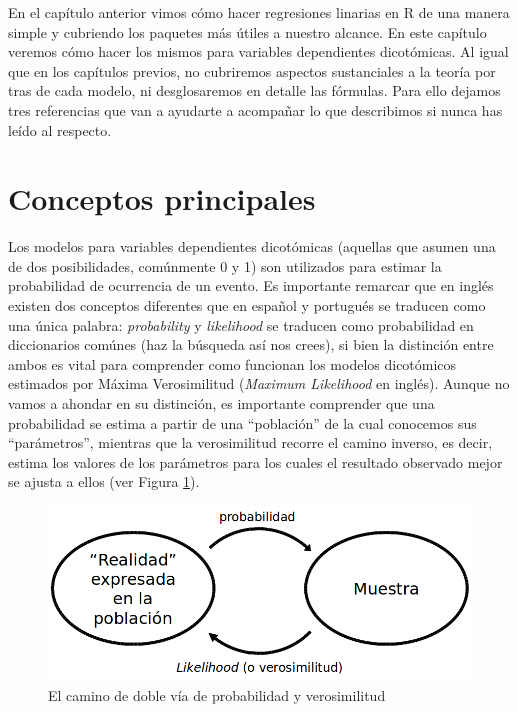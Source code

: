 \documentclass[]{book}
\begin{document}
En el capítulo anterior vimos cómo hacer regresiones linarias en R de
una manera simple y cubriendo los paquetes más útiles a nuestro alcance.
En este capítulo veremos cómo hacer los mismos para variables
dependientes dicotómicas. Al igual que en los capítulos previos, no
cubriremos aspectos sustanciales a la teoría por tras de cada modelo, ni
desglosaremos en detalle las fórmulas. Para ello dejamos tres
referencias que van a ayudarte a acompañar lo que describimos si nunca
has leído al respecto.

\section{Conceptos principales}\label{conceptos-principales}

Los modelos para variables dependientes dicotómicas (aquellas que asumen
una de dos posibilidades, comúnmente 0 y 1) son utilizados para estimar
la probabilidad de ocurrencia de un evento. Es importante remarcar que
en inglés existen dos conceptos diferentes que en español y portugués se
traducen como una única palabra: \emph{probability} y \emph{likelihood}
se traducen como probabilidad en diccionarios comúnes (haz la búsqueda
así nos crees), si bien la distinción entre ambos es vital para
comprender como funcionan los modelos dicotómicos estimados por Máxima
Verosimilitud (\emph{Maximum Likelihood} en inglés). Aunque no vamos a
ahondar en su distinción, es importante comprender que una probabilidad
se estima a partir de una ``población'' de la cual conocemos sus
``parámetros'', mientras que la verosimilitud recorre el camino inverso,
es decir, estima los valores de los parámetros para los cuales el
resultado observado mejor se ajusta a ellos (ver Figura
\ref{fig:bin-realmuestra}).

\begin{figure}

{\centering \includegraphics[width=11.56in]{00-images/bin-realmuestra} 

}

\caption{El camino de doble vía de probabilidad y verosimilitud}\label{fig:bin-realmuestra}
\end{figure}
\end{document}
